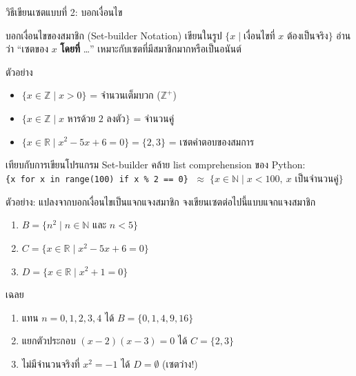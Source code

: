 \begin{frame}{วิธีเขียนเซตแบบที่ 2: บอกเงื่อนไข}
  \begin{block}{บอกเงื่อนไขของสมาชิก (Set-builder Notation)}
    เขียนในรูป $\{x \mid \text{เงื่อนไขที่ } x \text{ ต้องเป็นจริง}\}$
    อ่านว่า ``เซตของ $x$ \textbf{โดยที่} \ldots'' เหมาะกับเซตที่มีสมาชิกมากหรือเป็นอนันต์
  \end{block}
  \vspace{0.3em}
  ตัวอย่าง
  \begin{itemize}
    \item $\{x \in \mathbb{Z} \mid x > 0\}$ = จำนวนเต็มบวก ($\mathbb{Z}^+$)
    \item $\{x \in \mathbb{Z} \mid x \text{ หารด้วย 2 ลงตัว}\}$ = จำนวนคู่
    \item $\{x \in \mathbb{R} \mid x^2 - 5x + 6 = 0\} = \{2, 3\}$ = เซตคำตอบของสมการ
  \end{itemize}
  \vspace{0.3em}
  \begin{exampleblock}{เทียบกับการเขียนโปรแกรม}
    Set-builder คล้าย list comprehension ของ Python: \\
    \texttt{\{x for x in range(100) if x \% 2 == 0\}} $\;\approx\; \{x \in \mathbb{N} \mid x < 100,\ x \text{ เป็นจำนวนคู่}\}$
  \end{exampleblock}
\end{frame}

\begin{frame}{ตัวอย่าง: แปลงจากบอกเงื่อนไขเป็นแจกแจงสมาชิก}
  จงเขียนเซตต่อไปนี้แบบแจกแจงสมาชิก
  \begin{enumerate}
    \item $B = \{n^2 \mid n \in \mathbb{N} \text{ และ } n < 5\}$
    \item $C = \{x \in \mathbb{R} \mid x^2 - 5x + 6 = 0\}$
    \item $D = \{x \in \mathbb{R} \mid x^2 + 1 = 0\}$
  \end{enumerate}
  \pause
  \begin{exampleblock}{เฉลย}
    \begin{enumerate}\footnotesize
      \item แทน $n = 0, 1, 2, 3, 4$ ได้ $B = \{0, 1, 4, 9, 16\}$
      \item แยกตัวประกอบ $(x-2)(x-3) = 0$ ได้ $C = \{2, 3\}$
      \item ไม่มีจำนวนจริงที่ $x^2 = -1$ ได้ $D = \emptyset$ \quad (เซตว่าง!)
    \end{enumerate}
  \end{exampleblock}
\end{frame}

